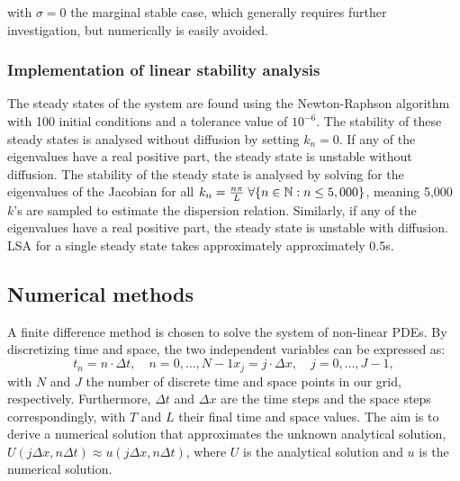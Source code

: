 \documentclass[10pt,letterpaper]{article}
\begin{document}
with $\sigma=0$ the marginal stable case, which generally requires further investigation, but numerically is easily avoided.

\subsubsection*{Implementation of linear stability analysis}
The steady states of the system are found using the Newton-Raphson algorithm with 100 initial conditions and a tolerance value of $10^{-6}$. The stability of these steady states is analysed without diffusion by setting $k_{n}=0$. If any of the eigenvalues have a real positive part, the steady state is unstable without diffusion. The stability of the steady state is analysed by solving for the eigenvalues of the Jacobian for all $k_{n}=\frac{n\pi}{L} \hspace{0.1cm}\forall \{n \in \mathbb{N} : n \leq 5,000\} $, meaning 5,000 $k$'s are sampled to estimate the dispersion relation. Similarly, if any of the eigenvalues have a real positive part, the steady state is unstable with diffusion. LSA for a single steady state takes approximately approximately 0.5s.

\subsection*{Numerical methods}\label{numerical methods}
A finite difference method is chosen to solve the system of non-linear PDEs. By discretizing time and space, the two independent variables can be expressed as:
\begin{subequations}
    \begin{equation}
        t_{n} = n \cdot \Delta t, \quad n=0,\dots,N-1
    \end{equation}
    \begin{equation}
        x_{j} = j \cdot \Delta x, \quad j=0, \dots,J-1,
    \end{equation}
\end{subequations}
with $N$ and $J$  the number of discrete time and space points in our grid, respectively. Furthermore, $\Delta t$ and $\Delta x$ are the time steps and the space steps correspondingly, with $T$ and $L$  their final time and space values. The aim is to derive a numerical solution that approximates the unknown analytical solution, $U(j\Delta x, n\Delta t)\approx u( j\Delta x, n\Delta t)$, where $U$ is the analytical solution and $u$ is the numerical solution.
\end{document}
